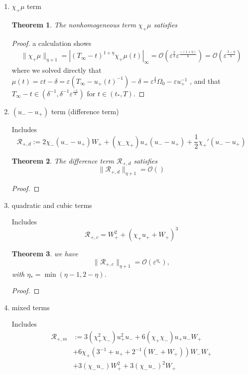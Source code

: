 \documentclass[letterpaper,11pt]{article}
\newcommand{\rmO}{\mathcal{O}}
\newcommand{\eps}{\varepsilon}
\numberwithin{equation}{section}
\theoremstyle{plain}
\newtheorem{theorem}{Theorem}[section]
\begin{document}
\begin{enumerate}
\begin{itemize}
\begin{enumerate}
\item  $\chi_+\mu$ term
\begin{theorem}
The nonhomogeneous term $\chi_+ \mu$ satisfies
\end{theorem}

\begin{proof}a calculation shows
\begin{align*}
\|\chi_+ \mu \|_{\eta+1} = |(T_\infty -t)^{1+\eta}\chi_+\mu(t) |_\infty  = \rmO( \eps^{\frac{2}{3}} \eps^{\frac{-(1+\eta)}{6}} ) = \rmO(\eps^{\frac{3-\eta}{6}} )
\end{align*}
where we solved directly that $\mu(t) = \eps t -\delta = \eps(T_\infty - u_+(t)^{-1})-\delta= \eps^{\frac{2}{3}}\Omega_0 - \eps u_+^{-1}$ , and that $T_\infty - t \in (\delta^{-1},\delta^{-1}\eps^{\frac{-1}{6}})$ for $t \in (t_*,T)$.
\end{proof}
\item $(u_- - u_+)$ term (difference term)

Includes
\[
\mathcal{R}_{+,d} := 2\chi_-(u_- - u_+)W_+ + (\chi_-\chi_+)u_+(u_- - u_+) + \frac{1}{2}\chi_+'(u_- - u_+)
\]

\begin{theorem}
The difference term $\mathcal{R}_{+,d}$ satisfies
\[
\|\mathcal{R}_{+,d} \|_{\eta+1}  = \rmO()
\]
\end{theorem}

\begin{proof}

\end{proof}

\item quadratic and cubic terms

Includes
\[
\mathcal{R}_{+,c} = W_+^2 + (\chi_+u_+ + W_+)^3
\]

\begin{theorem}
we have
\[
\| \mathcal{R}_{+,c} \|_{\eta+1} = \rmO(\eps^{\eta_*}),
\]
with $\eta_* = \min(\eta-1, 2-\eta)$.
\end{theorem}

\begin{proof}

\end{proof}
\item mixed terms

Includes
\begin{align*}
\mathcal{R}_{+,m} &:=3(\chi_+^2\chi_-)u_+^2u_- + 6(\chi_+\chi_-)u_+ u_- W_+\\
&+6\chi_+(3^{-1} + u_+ + 2^{-1}(W_-+W_+))W_-W_+\\
&+ 3(\chi_-u_-)W_+^2 + 3(\chi_-u_-)^2W_+
\end{align*}


\end{enumerate}
\end{itemize}
\end{enumerate}
\end{document}
